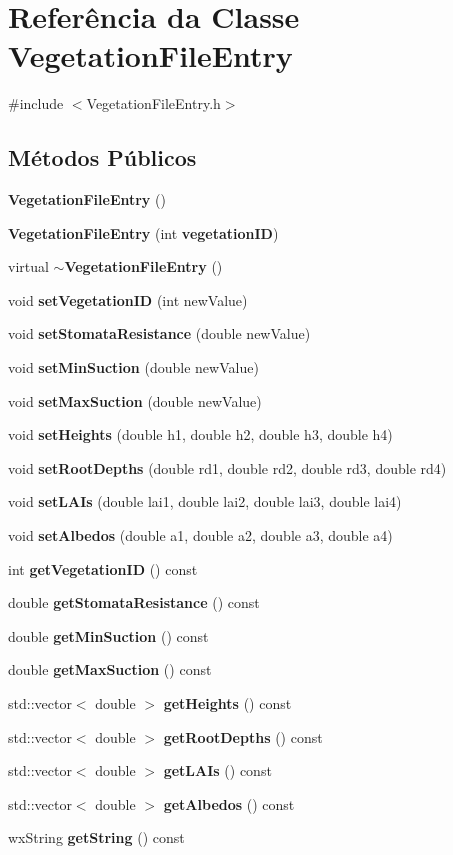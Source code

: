 \section{Referência da Classe Vegetation\+File\+Entry}
\label{class_vegetation_file_entry}


{\ttfamily \#include $<$Vegetation\+File\+Entry.\+h$>$}

\subsection*{Métodos Públicos}
\begin{DoxyCompactItemize}
\item 
{\bf Vegetation\+File\+Entry} ()
\item 
{\bf Vegetation\+File\+Entry} (int {\bf vegetation\+ID})
\item 
virtual {\bf $\sim$\+Vegetation\+File\+Entry} ()
\item 
void {\bf set\+Vegetation\+ID} (int new\+Value)
\item 
void {\bf set\+Stomata\+Resistance} (double new\+Value)
\item 
void {\bf set\+Min\+Suction} (double new\+Value)
\item 
void {\bf set\+Max\+Suction} (double new\+Value)
\item 
void {\bf set\+Heights} (double h1, double h2, double h3, double h4)
\item 
void {\bf set\+Root\+Depths} (double rd1, double rd2, double rd3, double rd4)
\item 
void {\bf set\+L\+A\+Is} (double lai1, double lai2, double lai3, double lai4)
\item 
void {\bf set\+Albedos} (double a1, double a2, double a3, double a4)
\item 
int {\bf get\+Vegetation\+ID} () const 
\item 
double {\bf get\+Stomata\+Resistance} () const 
\item 
double {\bf get\+Min\+Suction} () const 
\item 
double {\bf get\+Max\+Suction} () const 
\item 
std\+::vector$<$ double $>$ {\bf get\+Heights} () const 
\item 
std\+::vector$<$ double $>$ {\bf get\+Root\+Depths} () const 
\item 
std\+::vector$<$ double $>$ {\bf get\+L\+A\+Is} () const 
\item 
std\+::vector$<$ double $>$ {\bf get\+Albedos} () const 
\item 
wx\+String {\bf get\+String} () const 
\end{DoxyCompactItemize}
